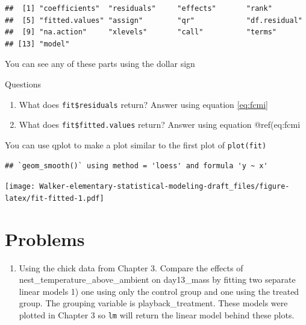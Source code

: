 \documentclass[]{book}
\newenvironment{Shaded}{\begin{snugshade}}{\end{snugshade}}
\newcommand{\KeywordTok}[1]{\textcolor[rgb]{0.13,0.29,0.53}{\textbf{#1}}}
\newcommand{\DataTypeTok}[1]{\textcolor[rgb]{0.13,0.29,0.53}{#1}}
\newcommand{\StringTok}[1]{\textcolor[rgb]{0.31,0.60,0.02}{#1}}
\newcommand{\OperatorTok}[1]{\textcolor[rgb]{0.81,0.36,0.00}{\textbf{#1}}}
\newcommand{\NormalTok}[1]{#1}
\providecommand{\tightlist}{%
  \setlength{\itemsep}{0pt}\setlength{\parskip}{0pt}}
\theoremstyle{definition}
\theoremstyle{definition}
\theoremstyle{definition}
\theoremstyle{remark}
\begin{document}
\begin{verbatim}
##  [1] "coefficients"  "residuals"     "effects"       "rank"         
##  [5] "fitted.values" "assign"        "qr"            "df.residual"  
##  [9] "na.action"     "xlevels"       "call"          "terms"        
## [13] "model"
\end{verbatim}

You can see any of these parts using the dollar sign

Questions

\begin{enumerate}
\def\labelenumi{\arabic{enumi}.}
\setcounter{enumi}{6}
\item
  What does \texttt{fit\$residuals} return? Answer using equation
  \eqref{eq:fcmi}
\item
  What does \texttt{fit\$fitted.values} return? Answer using equation
  @ref(eq:fcmi
\end{enumerate}

You can use qplot to make a plot similar to the first plot of
\texttt{plot(fit)}

\begin{Shaded}
\end{Shaded}

\begin{verbatim}
## `geom_smooth()` using method = 'loess' and formula 'y ~ x'
\end{verbatim}

\texttt{[image: Walker-elementary-statistical-modeling-draft\_files/figure-latex/fit-fitted-1.pdf]}

\section{Problems}\label{problems-1}

\begin{enumerate}
\def\labelenumi{\arabic{enumi}.}
\tightlist
\item
  Using the chick data from Chapter 3. Compare the effects of
  nest\_temperature\_above\_ambient on day13\_mass by fitting two
  separate linear models 1) one using only the control group and one
  using the treated group. The grouping variable is playback\_treatment.
  These models were plotted in Chapter 3 so \texttt{lm} will return the
  linear model behind these plots.
\end{enumerate}
\end{document}
